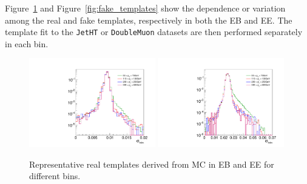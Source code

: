 Figure~\ref{fig:real_templates} and Figure~\ref{fig:fake_templates} show the \pt dependence or variation among the real and fake templates, respectively in both the EB and EE. The template fit to the \texttt{JetHT} or \texttt{DoubleMuon} datasets are then performed separately in each \pt bin.

\begin{figure}[!htbp]
\caption{Representative real templates derived from MC in EB and EE for different \pt bins.}
\centering
\includegraphics[width=0.49\textwidth]{fig/realtemplatecompEB_2018.pdf}
\includegraphics[width=0.49\textwidth]{fig/realtemplatecompEE_2018.pdf}
\label{fig:real_templates}
\end{figure}

